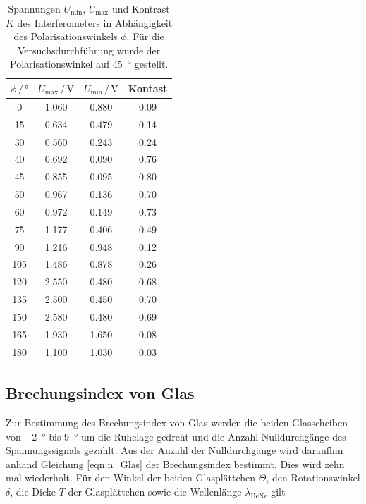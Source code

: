 \begin{table}[H]
  \centering
  \caption{Spannungen $U_\text{min}$, $U_\text{max}$ und Kontrast $K$ des Interferometers in Abhängigkeit des Polarisationswinkels $\phi$. Für die Versuchsdurchführung wurde der Polarisationswinkel auf \SI{45}{\degree} gestellt.}
  \label{tab:Kontrast}
  \begin{tabular}{cccc}
    \toprule
    $\phi \, / \,  \si{\degree}$ & $U_\text{max} \, / \, \si{\volt}$ &  $U_\text{min} \, / \, \si{\volt}$ & Kontast \\
    \midrule
    0   & \num{1.060} &  \num{0.880} & \num{0.09} \\
    15  & \num{0.634} &  \num{0.479} & \num{0.14} \\
    30  & \num{0.560} &  \num{0.243} & \num{0.24} \\
    40  & \num{0.692} &  \num{0.090} & \num{0.76} \\
    45  & \num{0.855} &  \num{0.095} & \num{0.80} \\
    50  & \num{0.967} &  \num{0.136} & \num{0.70} \\
    60  & \num{0.972} &  \num{0.149} & \num{0.73} \\
    75  & \num{1.177} &  \num{0.406} & \num{0.49} \\
    90  & \num{1.216} &  \num{0.948} & \num{0.12} \\
    105 & \num{1.486} &  \num{0.878} & \num{0.26} \\
    120 & \num{2.550} &  \num{0.480} & \num{0.68} \\
    135 & \num{2.500} &  \num{0.450} & \num{0.70} \\
    150 & \num{2.580} &  \num{0.480} & \num{0.69} \\
    165 & \num{1.930} &  \num{1.650} & \num{0.08} \\
    180 & \num{1.100} &  \num{1.030} & \num{0.03} \\
    \bottomrule
  \end{tabular}
\end{table}


\subsection{Brechungsindex von Glas}

Zur Bestimmung des Brechungsindex von Glas werden die beiden Glasscheiben von \SI{-2}{\degree} bis \SI{9}{\degree} um die Ruhelage gedreht und die Anzahl Nulldurchgänge des Spannungssignals gezählt. Aus der Anzahl der Nulldurchgänge wird daraufhin anhand Gleichung \eqref{eqn:n_Glas} der Brechungsindex bestimmt. Dies wird zehn mal wiederholt. Für den Winkel der beiden Glasplättchen $\Theta$, den Rotationswinkel $\delta$, die Dicke $T$ der Glasplättchen sowie die Wellenlänge $\lambda_\text{HeNe}$ gilt

